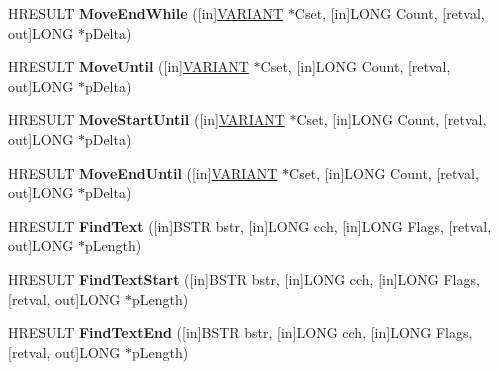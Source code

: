 \begin{DoxyCompactItemize}
\item 
\mbox{\label{interface_i_text_range_a226750c85f61fc0226d76b60394eb5ae}} 
H\+R\+E\+S\+U\+LT {\bfseries Move\+End\+While} (\mbox{[}in\mbox{]}\hyperlink{structtag_v_a_r_i_a_n_t}{V\+A\+R\+I\+A\+NT} $\ast$Cset, \mbox{[}in\mbox{]}L\+O\+NG Count, \mbox{[}retval, out\mbox{]}L\+O\+NG $\ast$p\+Delta)
\item 
\mbox{\label{interface_i_text_range_aa244fafeb843e08c4ff0496db90bd6ed}} 
H\+R\+E\+S\+U\+LT {\bfseries Move\+Until} (\mbox{[}in\mbox{]}\hyperlink{structtag_v_a_r_i_a_n_t}{V\+A\+R\+I\+A\+NT} $\ast$Cset, \mbox{[}in\mbox{]}L\+O\+NG Count, \mbox{[}retval, out\mbox{]}L\+O\+NG $\ast$p\+Delta)
\item 
\mbox{\label{interface_i_text_range_a6a1aa796c28857b824f5970627fb50a7}} 
H\+R\+E\+S\+U\+LT {\bfseries Move\+Start\+Until} (\mbox{[}in\mbox{]}\hyperlink{structtag_v_a_r_i_a_n_t}{V\+A\+R\+I\+A\+NT} $\ast$Cset, \mbox{[}in\mbox{]}L\+O\+NG Count, \mbox{[}retval, out\mbox{]}L\+O\+NG $\ast$p\+Delta)
\item 
\mbox{\label{interface_i_text_range_ae78836f612a4aee8a2d10edd7ce4d944}} 
H\+R\+E\+S\+U\+LT {\bfseries Move\+End\+Until} (\mbox{[}in\mbox{]}\hyperlink{structtag_v_a_r_i_a_n_t}{V\+A\+R\+I\+A\+NT} $\ast$Cset, \mbox{[}in\mbox{]}L\+O\+NG Count, \mbox{[}retval, out\mbox{]}L\+O\+NG $\ast$p\+Delta)
\item 
\mbox{\label{interface_i_text_range_aa25c349ee7efbbc3c0d72b2541ef050f}} 
H\+R\+E\+S\+U\+LT {\bfseries Find\+Text} (\mbox{[}in\mbox{]}B\+S\+TR bstr, \mbox{[}in\mbox{]}L\+O\+NG cch, \mbox{[}in\mbox{]}L\+O\+NG Flags, \mbox{[}retval, out\mbox{]}L\+O\+NG $\ast$p\+Length)
\item 
\mbox{\label{interface_i_text_range_a8255c236a72e352d241b634bb8916c77}} 
H\+R\+E\+S\+U\+LT {\bfseries Find\+Text\+Start} (\mbox{[}in\mbox{]}B\+S\+TR bstr, \mbox{[}in\mbox{]}L\+O\+NG cch, \mbox{[}in\mbox{]}L\+O\+NG Flags, \mbox{[}retval, out\mbox{]}L\+O\+NG $\ast$p\+Length)
\item 
\mbox{\label{interface_i_text_range_a66b99269f778d5148e48279931da4555}} 
H\+R\+E\+S\+U\+LT {\bfseries Find\+Text\+End} (\mbox{[}in\mbox{]}B\+S\+TR bstr, \mbox{[}in\mbox{]}L\+O\+NG cch, \mbox{[}in\mbox{]}L\+O\+NG Flags, \mbox{[}retval, out\mbox{]}L\+O\+NG $\ast$p\+Length)

\end{DoxyCompactItemize}
